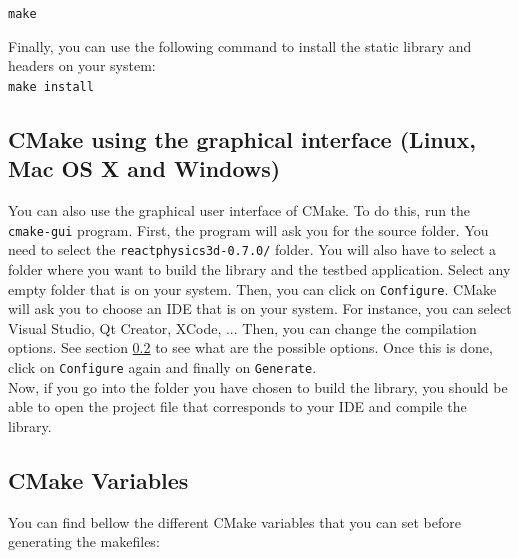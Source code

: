 \documentclass[a4paper,12pt]{article}
\begin{document}
    \texttt{make}

    Finally, you can use the following command to install the static library and headers on your system: \\

    \texttt{make install}

    \subsection{CMake using the graphical interface (Linux, Mac OS X and Windows)}

     You can also use the graphical user interface of CMake. To do this,
     run the \texttt{cmake-gui} program. First, the program will ask you for the
     source folder. You need to select the \texttt{reactphysics3d-0.7.0/} folder. You will also have to select a folder where you want to
     build the library and the testbed application. Select any empty folder that
     is on your system. Then, you can click on \texttt{Configure}. CMake will ask you to choose an IDE that is on
     your system. For instance, you can select Visual Studio, Qt Creator, XCode, ... Then, you
     can change the compilation options. See section \ref{sec:cmakevariables} to see what are the possible options.
     Once this is done, click on \texttt{Configure} again and finally on \texttt{Generate}. \\

     Now, if you go into the folder you have chosen to build the
     library, you should be able to open the project file that corresponds to your IDE and compile
     the library. \\

     \subsection{CMake Variables}
     \label{sec:cmakevariables}

     You can find bellow the different CMake variables that you can set before generating the makefiles:
\end{document}
